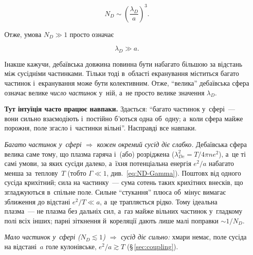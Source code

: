 \begin{equation*}
    N_D\sim\left(\frac{\lambda_D}{a}\right)^3.
\end{equation*}

Отже, умова $N_D\gg1$ просто означає

\begin{equation*}
    \lambda_D\gg a.
\end{equation*}

Інакше кажучи, дебаївська довжина повинна бути набагато більшою за відстань між сусідніми
частинками. Тільки тоді в~області екранування міститься багато частинок і~екранування може
бути колективним. Отже, \enquote{велика} дебаївська сфера означає велике \emph{число частинок} у~ній, а~не просто велике значення $\lambda_D$.

\begin{Attention}
    \textbf{Тут інтуїція часто працює навпаки.} Здається: \enquote{багато частинок у~сфері~---
    вони сильно взаємодіють і~постійно б'ються одна об~одну; а~коли сфера майже порожня, поле
    згасло і~частинки вільні}. Насправді все навпаки.

    \emph{Багато частинок у~сфері $\Rightarrow$ кожен окремий сусід діє слабко.}
    Дебаївська сфера велика саме тому, що плазма гаряча і~(або) розріджена
    ($\lambda_{De}^2=T/4\pi ne^2$), а~це ті самі умови, за яких сусіди далеко, а~їхня
    потенціальна енергія $e^2/a$ набагато менша за~теплову~$T$ (тобто $\Gamma\ll1$, див.~\eqref{eq:ND-Gamma}).
    Поштовх від одного сусіда крихітний; сила на частинку~--- сума сотень таких крихітних внесків,
    що згладжуються в~спільне поле. Сильне \enquote{стукання} плюса об~мінус вимагає зближення
    до відстані $e^2/T\ll a$, а~це трапляється рідко. Тому ідеальна плазма~--- не плазма без дальніх
    сил, а~газ майже вільних частинок у~гладкому полі всіх інших; парні зіткнення й~кореляції
    дають лише малі поправки $\sim1/N_D$.

    \emph{Мало частинок у~сфері ($N_D\lesssim1$) $\Rightarrow$ сусід діє сильно:} хмари немає, поле
    сусіда на відстані~$a$ голе кулонівське, $e^2/a\gtrsim T$ (§\,\ref{sec:coupling}).
\end{Attention}

